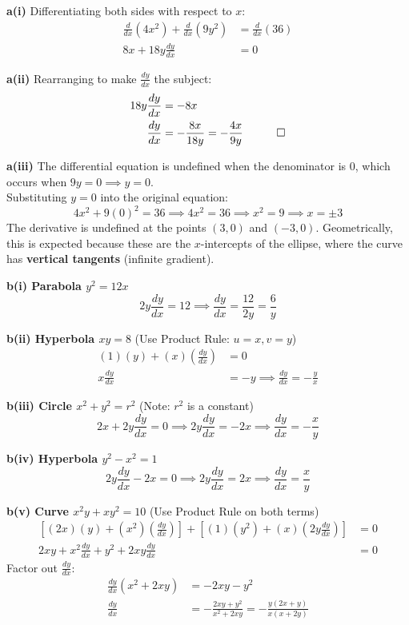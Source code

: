\begin{solution}
\textbf{a(i)} Differentiating both sides with respect to $x$:
\begin{align*}
    \frac{d}{dx}(4x^2) + \frac{d}{dx}(9y^2) &= \frac{d}{dx}(36) \\
    8x + 18y \frac{dy}{dx} &= 0
\end{align*}

\textbf{a(ii)} Rearranging to make $\frac{dy}{dx}$ the subject:
\begin{align*}
    18y \frac{dy}{dx} &= -8x \\
    \frac{dy}{dx} &= -\frac{8x}{18y} = -\frac{4x}{9y} \quad \qed
\end{align*}

\textbf{a(iii)} The differential equation is undefined when the denominator is $0$, which occurs when $9y = 0 \implies y = 0$. \\
Substituting $y = 0$ into the original equation:
\[ 4x^2 + 9(0)^2 = 36 \implies 4x^2 = 36 \implies x^2 = 9 \implies x = \pm 3 \]
The derivative is undefined at the points $(3, 0)$ and $(-3, 0)$. Geometrically, this is expected because these are the $x$-intercepts of the ellipse, where the curve has \textbf{vertical tangents} (infinite gradient).

\vspace{0.3cm}
\textbf{b(i) Parabola $y^2 = 12x$}
\[ 2y \frac{dy}{dx} = 12 \implies \frac{dy}{dx} = \frac{12}{2y} = \frac{6}{y} \]

\textbf{b(ii) Hyperbola $xy = 8$} (Use Product Rule: $u=x, v=y$)
\begin{align*}
    (1)(y) + (x)\left(\frac{dy}{dx}\right) &= 0 \\
    x \frac{dy}{dx} &= -y \implies \frac{dy}{dx} = -\frac{y}{x}
\end{align*}

\textbf{b(iii) Circle $x^2 + y^2 = r^2$} (Note: $r^2$ is a constant)
\[ 2x + 2y \frac{dy}{dx} = 0 \implies 2y \frac{dy}{dx} = -2x \implies \frac{dy}{dx} = -\frac{x}{y} \]

\textbf{b(iv) Hyperbola $y^2 - x^2 = 1$}
\[ 2y \frac{dy}{dx} - 2x = 0 \implies 2y \frac{dy}{dx} = 2x \implies \frac{dy}{dx} = \frac{x}{y} \]

\textbf{b(v) Curve $x^2y + xy^2 = 10$} (Use Product Rule on both terms)
\begin{align*}
    \left[ (2x)(y) + (x^2)\left(\frac{dy}{dx}\right) \right] + \left[ (1)(y^2) + (x)\left(2y \frac{dy}{dx}\right) \right] &= 0 \\
    2xy + x^2 \frac{dy}{dx} + y^2 + 2xy \frac{dy}{dx} &= 0
\end{align*}
Factor out $\frac{dy}{dx}$:
\begin{align*}
    \frac{dy}{dx}(x^2 + 2xy) &= -2xy - y^2 \\
    \frac{dy}{dx} &= -\frac{2xy + y^2}{x^2 + 2xy} = -\frac{y(2x+y)}{x(x+2y)}
\end{align*}


\end{solution}
